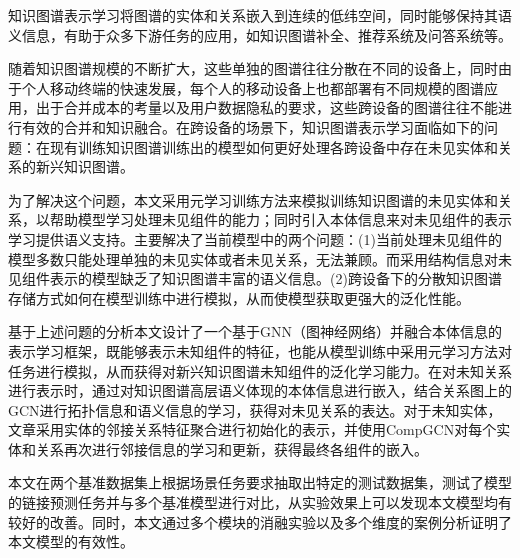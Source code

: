 
知识图谱表示学习将图谱的实体和关系嵌入到连续的低纬空间，同时能够保持其语义信息，有助于众多下游任务的应用，如知识图谱补全、推荐系统及问答系统等。

随着知识图谱规模的不断扩大，这些单独的图谱往往分散在不同的设备上，同时由于个人移动终端的快速发展，每个人的移动设备上也都部署有不同规模的图谱应用，出于合并成本的考量以及用户数据隐私的要求，这些跨设备的图谱往往不能进行有效的合并和知识融合。在跨设备的场景下，知识图谱表示学习面临如下的问题：在现有训练知识图谱训练出的模型如何更好处理各跨设备中存在未见实体和关系的新兴知识图谱。

为了解决这个问题，本文采用元学习训练方法来模拟训练知识图谱的未见实体和关系，以帮助模型学习处理未见组件的能力；同时引入本体信息来对未见组件的表示学习提供语义支持。主要解决了当前模型中的两个问题：(1)当前处理未见组件的模型多数只能处理单独的未见实体或者未见关系，无法兼顾。而采用结构信息对未见组件表示的模型缺乏了知识图谱丰富的语义信息。(2)跨设备下的分散知识图谱存储方式如何在模型训练中进行模拟，从而使模型获取更强大的泛化性能。

基于上述问题的分析本文设计了一个基于GNN（图神经网络）并融合本体信息的表示学习框架，既能够表示未知组件的特征，也能从模型训练中采用元学习方法对任务进行模拟，从而获得对新兴知识图谱未知组件的泛化学习能力。在对未知关系进行表示时，通过对知识图谱高层语义体现的本体信息进行嵌入，结合关系图上的GCN进行拓扑信息和语义信息的学习，获得对未见关系的表达。对于未知实体，文章采用实体的邻接关系特征聚合进行初始化的表示，并使用CompGCN对每个实体和关系再次进行邻接信息的学习和更新，获得最终各组件的嵌入。

本文在两个基准数据集上根据场景任务要求抽取出特定的测试数据集，测试了模型的链接预测任务并与多个基准模型进行对比，从实验效果上可以发现本文模型均有较好的改善。同时，本文通过多个模块的消融实验以及多个维度的案例分析证明了本文模型的有效性。


